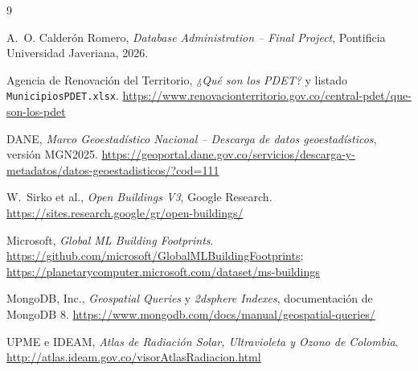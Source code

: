 \documentclass[11pt,a4paper]{article}
\begin{document}
\begin{thebibliography}{9}

A.~O. Calderón Romero, \emph{Database Administration -- Final Project},
Pontificia Universidad Javeriana, 2026.

Agencia de Renovación del Territorio, \emph{¿Qué son los PDET?} y listado
\texttt{MunicipiosPDET.xlsx}.
\url{https://www.renovacionterritorio.gov.co/central-pdet/que-son-los-pdet}

DANE, \emph{Marco Geoestadístico Nacional -- Descarga de datos
geoestadísticos}, versión MGN2025.
\url{https://geoportal.dane.gov.co/servicios/descarga-y-metadatos/datos-geoestadisticos/?cod=111}

W.~Sirko et al., \emph{Open Buildings V3}, Google Research.
\url{https://sites.research.google/gr/open-buildings/}

Microsoft, \emph{Global ML Building Footprints}.
\url{https://github.com/microsoft/GlobalMLBuildingFootprints};
\url{https://planetarycomputer.microsoft.com/dataset/ms-buildings}

MongoDB, Inc., \emph{Geospatial Queries} y \emph{2dsphere Indexes},
documentación de MongoDB 8.
\url{https://www.mongodb.com/docs/manual/geospatial-queries/}

UPME e IDEAM, \emph{Atlas de Radiación Solar, Ultravioleta y Ozono de
Colombia}.
\url{http://atlas.ideam.gov.co/visorAtlasRadiacion.html}

\end{thebibliography}

\appendix

\end{document}
